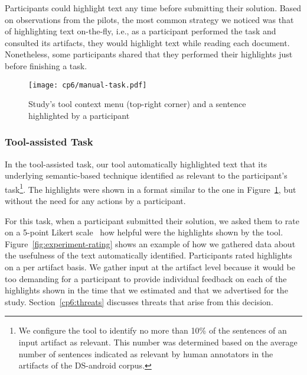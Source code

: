 Participants could highlight text any time before submitting their solution. 
Based on observations from the pilots, the most common strategy we noticed was that of highlighting 
text on-the-fly, i.e., as a participant performed the task and consulted its artifacts, they would highlight text 
while reading each document. Nonetheless, some participants 
shared that they performed their highlights just before finishing a task.





\begin{figure}
    \centering
    \texttt{[image: cp6/manual-task.pdf]}
    \caption{Study's tool context menu (top-right corner) and a sentence highlighted by a participant}
    \label{fig:artifact-pre-highlight}
\end{figure}




\subsubsection{Tool-assisted Task}
\label{cp6:procedures-tool-assisted}


In the tool-assisted task, our tool automatically highlighted text that 
its underlying semantic-based technique identified as relevant to the participant's task\footnote{
    We configure the tool to identify no more than 10\% of the sentences of an input artifact as relevant.
    This number was determined based on the average number of sentences indicated as relevant by human annotators in the artifacts of the \acs{DS-android} corpus.
}.
The highlights were shown in a format similar to the one in Figure~\ref{fig:artifact-pre-highlight}, but without the need for any actions by a participant.




For this task, when a participant submitted their solution, we asked them to 
rate on a 5-point Likert scale~\cite{likert1932technique} how helpful were the highlights shown by the tool.
Figure~\ref{fig:experiment-rating} shows an example of how we gathered data about the usefulness of the text automatically identified.
Participants rated highlights on a per artifact basis.
We gather input at the artifact level because it would be too demanding for a participant 
to provide individual feedback on each of the highlights shown
in the time that we estimated and that we advertised for the study.
Section~\ref{cp6:threats} discusses  threats that arise from this decision.




